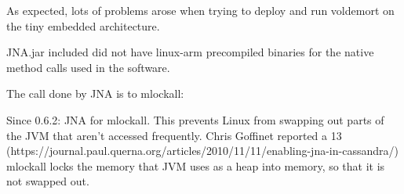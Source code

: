 As expected, lots of problems arose when trying to deploy and run voldemort on the tiny embedded architecture.

JNA.jar included did not have linux-arm precompiled binaries for the native method calls used in the software.

The call done by JNA is to mlockall:

Since 0.6.2: JNA for mlockall. This prevents Linux from swapping out parts of the JVM that aren't accessed frequently. Chris Goffinet reported a 13%
(https://journal.paul.querna.org/articles/2010/11/11/enabling-jna-in-cassandra/)
mlockall locks the memory that JVM uses as a heap into memory, so that it is not swapped out.

